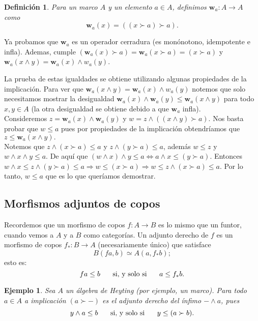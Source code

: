 \documentclass[12pt,letterpaper,titlepage]{article}
\newtheorem*{defn}{Definición}
\newtheorem*{exa}{Ejemplo}
\theoremstyle{definition}
\renewcommand\inf{\wedge}
\newcommand\ssi{\hspace{5mm}\text{ si, y solo si }\hspace{5mm}}
\newcommand\wnuc[1]{\mathbf w_{#1}}
\newcommand\<{\langle}
\renewcommand\>{\rangle}
\begin{document}
\begin{defn}
  Para un marco $A$ y un elemento $a\in A$, definimos
  $\wnuc a:A\to A$ como
  \[
    \wnuc a(x)=((x\succ a)\succ a)
  .\]
\end{defn}
Ya probamos que $\wnuc a$ es un operador cerradura
(es monónotono, idempotente e infla).
Ademas, cumple $(\wnuc a(x)\succ a) = \wnuc a(x\succ a)=(x\succ a)$ y
$\wnuc a(x\inf y) = \wnuc a(x)\inf w_a(y)$.

\noindent
La prueba de estas igualdades se obtiene utilizando algunas propiedades de la implicación.
Para ver que $\wnuc a(x\wedge y)=\wnuc a(x)\wedge w_a(y)$
notemos que solo necesitamos mostrar la desigualdad
$\wnuc a(x)\wedge \wnuc a(y)\leq \wnuc a(x\wedge y)$
para todo $x,y\in A$
(la otra desigualdad se obtiene debido a que $\wnuc a$ infla).\\
Consideremos $z=\wnuc a(x)\wedge \wnuc a(y)$ y $w=z\wedge ((x\wedge y)\succ a).$ Nos basta probar que $w\leq a$ pues por propiedades de la implicación obtendríamos que $z\leq \wnuc a(x\wedge y).$\\
Notemos que $z\wedge (x\succ a)\leq a$ y $z\wedge (y\succ a)\leq a$, además $w\leq z$ y $w\wedge x\wedge y\leq a$. De aquí que $(w\wedge x)\wedge y\leq a\Leftrightarrow a\wedge x\leq (y\succ a)$. Entonces $w\wedge x\leq z\wedge (y\succ a)\leq a\Rightarrow w\leq (x\succ a)\Rightarrow w\leq z\wedge (x\succ a)\leq a$. Por lo tanto, $w\leq a$ que es lo que queríamos demostrar.


\subsection{Morfismos adjuntos de copos}
Recordemos que un morfismo de copos $f:A\to B$ es lo mismo
que un funtor, cuando vemos a $A$ y a $B$ como categorías.
Un adjunto derecho de $f$ es un morfismo de copos $f_*:B\to A$
(necesariamente único) que satisface
\[
    B(fa,b) \simeq A(a,f_*b)
;\]
esto es:
\[
    fa\leq b \ssi a\leq f_*b
.\]

\begin{exa}
  Sea $A$ un álgebra de Heyting (por ejemplo, un marco).
  Para todo $a\in A$ a implicación $(a\succ -)$ es
  el adjunto derecho del ínfimo $-\inf a$, pues
  \[
    y\inf a\leq b \ssi y\leq (a\succ b)
  .\]
\end{exa}
\end{document}
